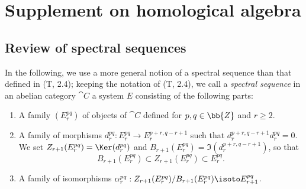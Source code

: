 \section{Supplement on homological algebra}
\label{section:0.11}

\subsection{Review of spectral sequences}
\label{subsection:0.11.1}

\begin{env}[11.1.1]
\label{0.11.1.1}
In the following, we use a more general notion of a spectral sequence than that defined in (T, 2.4); keeping the notation of (T, 2.4), we call a \emph{spectral sequence} in an abelian category $\cat{C}$ a system $E$ consisting of the following parts:
\begin{enumerate}
  \item[(a)] A family $(E_r^{pq})$ of objects of $\cat{C}$ defined for $p,q\in\bb{Z}$ and $r\geq 2$.
  \item[(b)] A family of morphisms $d_r^{pq}:E_r^{pq}\to E_r^{p+r,q-r+1}$ such that $d_r^{p+r,q-r+1}d_r^{pq}=0$.
    We set $Z_{r+1}(E_r^{pq})=\Ker(d_r^{pq})$ and $B_{r+1}(E_r^{pq})=\Im(d_r^{p+r,q-r+1})$, so that
    \[
      B_{r+1}(E_r^{pq})\subset Z_{r+1}(E_r^{pq})\subset E_r^{pq}.
    \]
  \item[(c)] A family of isomorphisms $\alpha_r^{pq}:Z_{r+1}(E_r^{pq})/B_{r+1}(E_r^{pq})\isoto E_{r+1}^{pq}$.


\end{enumerate}
\end{env}
